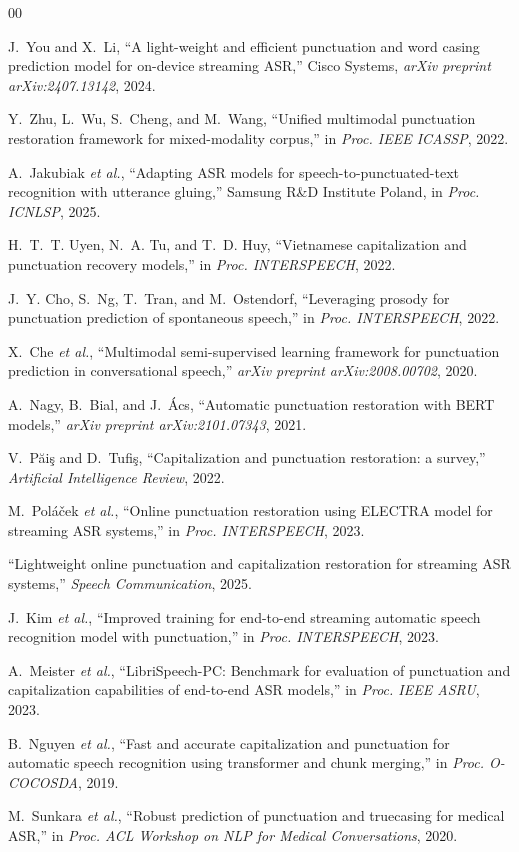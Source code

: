 \documentclass[conference]{IEEEtran}
\begin{document}
\begin{thebibliography}{00}

J.~You and X.~Li, ``A light-weight and efficient punctuation and word casing
prediction model for on-device streaming ASR,'' Cisco Systems, \emph{arXiv
preprint arXiv:2407.13142}, 2024.

Y.~Zhu, L.~Wu, S.~Cheng, and M.~Wang, ``Unified multimodal punctuation restoration
framework for mixed-modality corpus,'' in \emph{Proc. IEEE ICASSP}, 2022.

A.~Jakubiak \emph{et al.}, ``Adapting ASR models for speech-to-punctuated-text
recognition with utterance gluing,'' Samsung R\&D Institute Poland, in
\emph{Proc. ICNLSP}, 2025.

H.~T.~T. Uyen, N.~A. Tu, and T.~D. Huy, ``Vietnamese capitalization and punctuation
recovery models,'' in \emph{Proc. INTERSPEECH}, 2022.

J.~Y. Cho, S.~Ng, T.~Tran, and M.~Ostendorf, ``Leveraging prosody for punctuation
prediction of spontaneous speech,'' in \emph{Proc. INTERSPEECH}, 2022.

X.~Che \emph{et al.}, ``Multimodal semi-supervised learning framework for
punctuation prediction in conversational speech,'' \emph{arXiv preprint
arXiv:2008.00702}, 2020.

A.~Nagy, B.~Bial, and J.~\'Acs, ``Automatic punctuation restoration with BERT
models,'' \emph{arXiv preprint arXiv:2101.07343}, 2021.

V.~P\u{a}i\c{s} and D.~Tufi\c{s}, ``Capitalization and punctuation restoration:
a survey,'' \emph{Artificial Intelligence Review}, 2022.

M.~Pol\'a\v{c}ek \emph{et al.}, ``Online punctuation restoration using ELECTRA
model for streaming ASR systems,'' in \emph{Proc. INTERSPEECH}, 2023.

``Lightweight online punctuation and capitalization restoration for streaming ASR
systems,'' \emph{Speech Communication}, 2025.

J.~Kim \emph{et al.}, ``Improved training for end-to-end streaming automatic
speech recognition model with punctuation,'' in \emph{Proc. INTERSPEECH}, 2023.

A.~Meister \emph{et al.}, ``LibriSpeech-PC: Benchmark for evaluation of
punctuation and capitalization capabilities of end-to-end ASR models,'' in
\emph{Proc. IEEE ASRU}, 2023.

B.~Nguyen \emph{et al.}, ``Fast and accurate capitalization and punctuation for
automatic speech recognition using transformer and chunk merging,'' in
\emph{Proc. O-COCOSDA}, 2019.

M.~Sunkara \emph{et al.}, ``Robust prediction of punctuation and truecasing for
medical ASR,'' in \emph{Proc. ACL Workshop on NLP for Medical Conversations},
2020.

\end{thebibliography}
\end{document}
